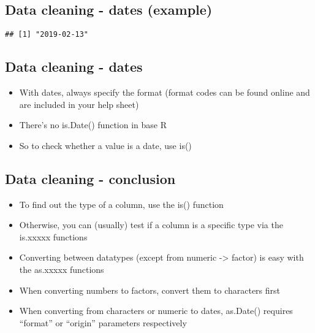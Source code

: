 \documentclass[]{article}
\newenvironment{Shaded}{\begin{snugshade}}{\end{snugshade}}
\newcommand{\KeywordTok}[1]{\textcolor[rgb]{0.13,0.29,0.53}{\textbf{#1}}}
\newcommand{\DataTypeTok}[1]{\textcolor[rgb]{0.13,0.29,0.53}{#1}}
\newcommand{\DecValTok}[1]{\textcolor[rgb]{0.00,0.00,0.81}{#1}}
\newcommand{\StringTok}[1]{\textcolor[rgb]{0.31,0.60,0.02}{#1}}
\newcommand{\NormalTok}[1]{#1}
\providecommand{\tightlist}{%
  \setlength{\itemsep}{0pt}\setlength{\parskip}{0pt}}
\begin{document}
\subsection{Data cleaning - dates
(example)}\label{data-cleaning---dates-example-1}

\begin{Shaded}
\end{Shaded}

\begin{verbatim}
## [1] "2019-02-13"
\end{verbatim}

\subsection{Data cleaning - dates}\label{data-cleaning---dates-2}

\begin{itemize}
\tightlist
\item
  With dates, always specify the format (format codes can be found
  online and are included in your help sheet)
\item
  There's no is.Date() function in base R
\item
  So to check whether a value is a date, use is()
\end{itemize}

\subsection{Data cleaning -
conclusion}\label{data-cleaning---conclusion}

\begin{itemize}
\tightlist
\item
  To find out the type of a column, use the is() function
\item
  Otherwise, you can (usually) test if a column is a specific type via
  the is.xxxxx functions
\item
  Converting between datatypes (except from numeric -\textgreater{}
  factor) is easy with the as.xxxxx functions
\item
  When converting numbers to factors, convert them to characters first
\item
  When converting from characters or numeric to dates, as.Date()
  requires ``format'' or ``origin'' parameters respectively
\end{itemize}
\end{document}
